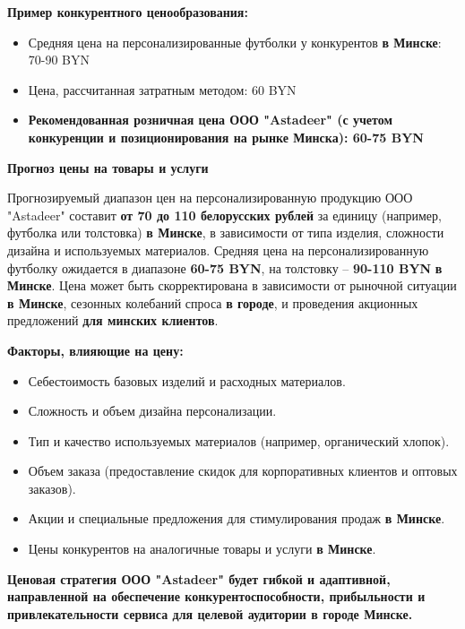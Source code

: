\textbf{Пример конкурентного ценообразования:}

\begin{itemize}[noitemsep]
\item Средняя цена на персонализированные футболки у конкурентов \textbf{в Минске}: 70-90 BYN
\item Цена, рассчитанная затратным методом: 60 BYN
\item \textbf{Рекомендованная розничная цена ООО "Astadeer" (с учетом конкуренции и позиционирования на рынке Минска): 60-75 BYN}
\end{itemize}

\textbf{Прогноз цены на товары и услуги}

Прогнозируемый диапазон цен на персонализированную продукцию ООО "Astadeer" составит \textbf{от 70 до 110 белорусских рублей} за единицу (например, футболка или толстовка) \textbf{в Минске}, в зависимости от типа изделия, сложности дизайна и используемых материалов.  Средняя цена на персонализированную футболку ожидается в диапазоне \textbf{60-75 BYN}, на толстовку – \textbf{90-110 BYN} \textbf{в Минске}.  Цена может быть скорректирована в зависимости от рыночной ситуации \textbf{в Минске}, сезонных колебаний спроса \textbf{в городе}, и проведения акционных предложений \textbf{для минских клиентов}.

\vspace{0.9cm}

\textbf{Факторы, влияющие на цену:}

\begin{itemize}[noitemsep]
\item Себестоимость базовых изделий и расходных материалов.
\item Сложность и объем дизайна персонализации.
\item Тип и качество используемых материалов (например, органический хлопок).
\item Объем заказа (предоставление скидок для корпоративных клиентов и оптовых заказов).
\item Акции и специальные предложения для стимулирования продаж \textbf{в Минске}.
\item Цены конкурентов на аналогичные товары и услуги \textbf{в Минске}.
\end{itemize}

\vspace{0.3cm}

\textbf{Ценовая стратегия ООО "Astadeer" будет гибкой и адаптивной, направленной на обеспечение конкурентоспособности, прибыльности и привлекательности сервиса для целевой аудитории \textbf{в городе Минске}.}